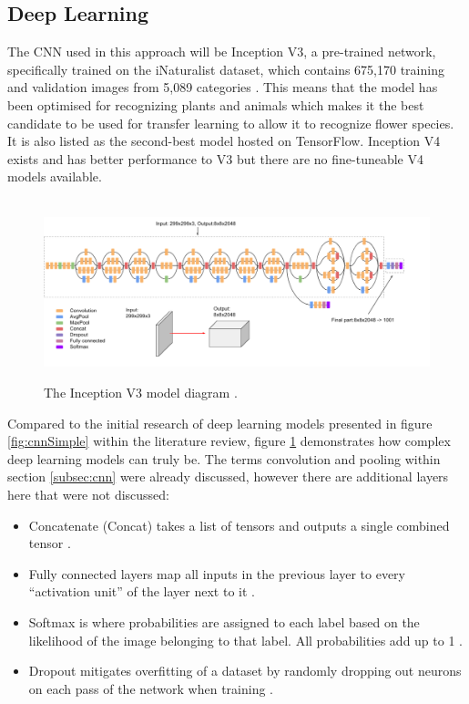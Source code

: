 \documentclass[12pt,a4paper]{report}
\begin{document}
\subsection{Deep Learning}

The CNN used in this approach will be Inception V3, a pre-trained network, specifically trained on the iNaturalist 
dataset, which contains 675,170 training and validation images from 5,089 categories \citep{paperswithcode}. 
This means that the model has been optimised for recognizing plants and animals which makes it the best candidate to be 
used for transfer learning to allow it to recognize flower species. It is also listed as the second-best model hosted on
TensorFlow. Inception V4 exists and has better performance to V3 but there are no fine-tuneable V4 models available.   

\begin{figure}[h]\
    \centering
    \includegraphics[width=\textwidth]{inceptionv3.png}
    \caption{The Inception V3 model diagram \citep{GoogleCloud}.}
    \label{fig:inception}
\end{figure}

Compared to the initial research of deep learning models presented in figure \ref{fig:cnnSimple} within the literature 
review, figure \ref{fig:inception} demonstrates how complex deep learning models can truly be. 
The terms convolution and pooling within section \ref{subsec:cnn} were already discussed, however there are additional 
layers here that were not discussed:

\begin{itemize}
    \item Concatenate (Concat) takes a list of tensors and outputs a single combined tensor \citep{kerasconcat}.
    \item Fully connected layers map all inputs in the previous layer to every “activation unit” of the layer next to it
\citep{singhsurya}.
    \item Softmax is where probabilities are assigned to each label based on the likelihood of the image belonging to 
that label. All probabilities add up to 1 \citep{googledevcnn}. 
    \item Dropout mitigates overfitting of a dataset by randomly dropping out neurons on each pass of the network when 
    training \citep{seb}. 
\end{itemize}
\end{document}
